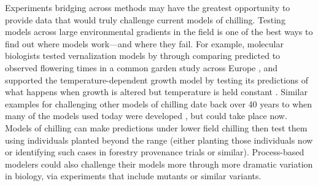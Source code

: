 \documentclass[11pt]{article}
\begin{document}
Experiments bridging across methods may have the greatest opportunity to provide data that would truly challenge current models of chilling. Testing models across large environmental gradients in the field is one of the best ways to find out where models work---and where they fail. For example, molecular biologists tested vernalization models by through comparing predicted to observed flowering times in a common garden study across Europe \citep[][]{Wilczek:2009oa}, and supported the temperature-dependent growth model by testing its predictions of what happens when growth is altered but temperature is held constant \citep{zhao2020temperature}. Similar examples for challenging other models of chilling date back over 40 years to when many of the models used today were developed \citep{richardson1974,chuine2016,ospreebbms}, but could take place now. Models of chilling can make predictions under lower field chilling then test them using individuals planted beyond the range (either planting those individuals now or identifying such cases in forestry provenance trials or similar). Process-based modelers could also challenge their models more through more dramatic variation in biology, via experiments that include mutants or similar variants. 
\end{document}
